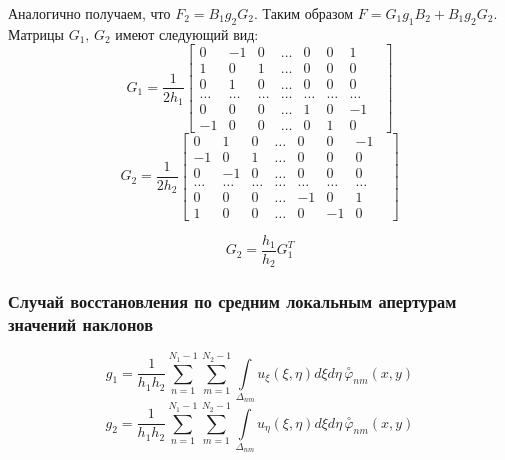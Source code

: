 \documentclass{article}
\begin{document}
Аналогично получаем, что $F_2 = B_1 g_2 G_2$.
Таким образом $F = G_1 g_1 B_2 + B_1 g_2 G_2$.
Матрицы $G_1,\,G_2$ имеют следующий вид:
$$G_1 = \frac{1}{2h_1}
\begin{bmatrix}
0 & -1 & 0 & \ldots & 0 & 0 & 1\\
1 & 0 & 1 & \ldots & 0 & 0 & 0\\
0 & 1 & 0 & \ldots &0 & 0 & 0\\
\ldots & \ldots & \ldots & \ldots & \ldots & \ldots & \ldots &\\
0 & 0 & 0 & \ldots & 1 & 0 & -1\\
-1 & 0 & 0 & \ldots & 0 & 1 & 0
\end{bmatrix}
$$
$$G_2 = \frac{1}{2h_2}
\begin{bmatrix}
0 & 1 & 0 & \ldots & 0 & 0 & -1\\
-1 & 0 & 1 & \ldots & 0 & 0 & 0\\
0 & -1 & 0 & \ldots &0 & 0 & 0\\
\ldots & \ldots & \ldots & \ldots & \ldots & \ldots & \ldots &\\
0 & 0 & 0 & \ldots & -1 & 0 & 1\\
1 & 0 & 0 & \ldots & 0 & -1 & 0
\end{bmatrix}
$$

$$G_2 = \frac{h_1}{h_2} G_1^T$$

\subsubsection{Случай восстановления по средним локальным апертурам значений наклонов}
\begin{equation}\label{g_1}
g_1 = \frac{1}{h_1h_2} \sum \limits_{n=1}^{N_1 - 1} \sum \limits_{m=1}^{N_2 - 1} \int \limits _{\Delta_{nm}} u_\xi(\xi,\eta) d\xi d\eta \,\overset{\circ}{\varphi}_{nm}(x,y)
\end{equation}
\begin{equation}\label{g_2}
g_2 = \frac{1}{h_1h_2} \sum \limits_{n=1}^{N_1 - 1} \sum \limits_{m=1}^{N_2 - 1} \int \limits _{\Delta_{nm}} u_\eta(\xi,\eta) d\xi d\eta \, \overset{\circ}{\varphi}_{nm}(x,y)
\end{equation}
\end{document}
